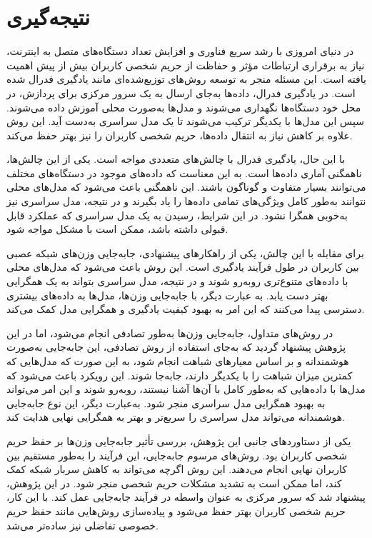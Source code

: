 \section{نتیجه‌گیری}

در دنیای امروزی با رشد سریع فناوری و افزایش تعداد دستگاه‌های متصل به اینترنت، نیاز به برقراری ارتباطات مؤثر و حفاظت از حریم شخصی کاربران بیش از پیش اهمیت یافته است. این مسئله منجر به توسعه روش‌های توزیع‌شده‌ای مانند یادگیری فدرال شده است. در یادگیری فدرال، داده‌ها به‌جای ارسال به یک سرور مرکزی برای پردازش، در محل خود دستگاه‌ها نگهداری می‌شوند و مدل‌ها به‌صورت محلی آموزش داده می‌شوند. سپس این مدل‌ها با یکدیگر ترکیب می‌شوند تا یک مدل سراسری به‌دست آید. این روش علاوه بر کاهش نیاز به انتقال داده‌ها، حریم شخصی کاربران را نیز بهتر حفظ می‌کند.

با این حال، یادگیری فدرال با چالش‌های متعددی مواجه است. یکی از این چالش‌ها، ناهمگنی آماری داده‌ها است. به این معناست که داده‌های موجود در دستگاه‌های مختلف می‌توانند بسیار متفاوت و گوناگون باشند. این ناهمگنی باعث می‌شود که مدل‌های محلی نتوانند به‌طور کامل ویژگی‌های تمامی داده‌ها را یاد بگیرند و در نتیجه، مدل سراسری نیز به‌خوبی همگرا نشود. در این شرایط، رسیدن به یک مدل سراسری که عملکرد قابل قبولی داشته باشد، ممکن است با مشکل مواجه شود.

برای مقابله با این چالش، یکی از راهکارهای پیشنهادی، جابه‌جایی وزن‌های شبکه عصبی بین کاربران در طول فرآیند یادگیری است. این روش باعث می‌شود که مدل‌های محلی با داده‌های متنوع‌تری روبه‌رو شوند و در نتیجه، مدل سراسری بتواند به یک همگرایی بهتر دست یابد. به عبارت دیگر، با جابه‌جایی وزن‌ها، مدل‌ها به داده‌های بیشتری دسترسی پیدا می‌کنند که این امر به بهبود کیفیت یادگیری و همگرایی مدل کمک می‌کند.

در روش‌های متداول، جابه‌جایی وزن‌ها به‌طور تصادفی انجام می‌شود، اما در این پژوهش پیشنهاد گردید که به‌جای استفاده از روش تصادفی، این جابه‌جایی به‌صورت هوشمندانه و بر اساس معیارهای شباهت انجام شود، به این صورت که مدل‌هایی که کمترین میزان شباهت را با یکدیگر دارند، جابه‌جا شوند. این رویکرد باعث می‌شود که مدل‌ها با داده‌هایی که به‌طور کامل با آن‌ها آشنا نیستند، روبه‌رو شوند و این امر می‌تواند به بهبود همگرایی مدل سراسری منجر شود. به‌عبارت دیگر، این نوع جابه‌جایی هوشمندانه می‌تواند مدل سراسری را سریع‌تر و بهتر به همگرایی نهایی هدایت کند.

یکی از دستاوردهای جانبی این پژوهش، بررسی تأثیر جابه‌جایی وزن‌ها بر حفظ حریم شخصی کاربران بود. روش‌های مرسوم جابه‌جایی، این فرآیند را به‌طور مستقیم بین کاربران نهایی انجام می‌دهند. این روش اگرچه می‌تواند به کاهش سربار شبکه کمک کند، اما ممکن است به تشدید مشکلات حریم شخصی منجر شود. در این پژوهش، پیشنهاد شد که سرور مرکزی به عنوان واسطه در فرآیند جابه‌جایی عمل کند. با این کار، حریم شخصی کاربران بهتر حفظ می‌شود و پیاده‌سازی روش‌هایی مانند حفظ حریم خصوصی تفاضلی نیز ساده‌تر می‌شد.

